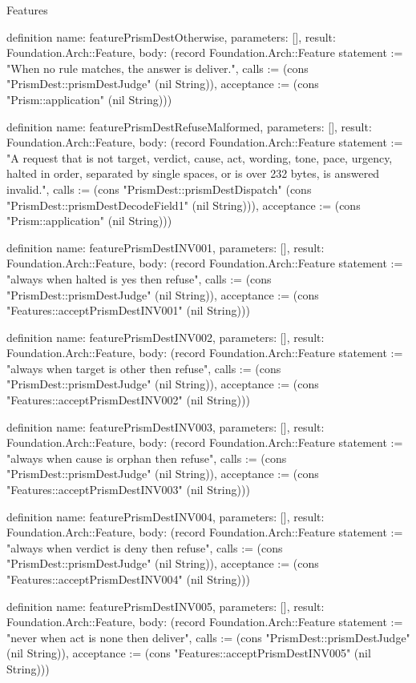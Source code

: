 \begin{lexlean}{Features}
\begin{semanticmodule}
definition{
  name: featurePrismDestOtherwise,
  parameters: [],
  result: Foundation.Arch::Feature,
  body: (record Foundation.Arch::Feature {statement := "When no rule matches, the answer is deliver.", calls := (cons "PrismDest::prismDestJudge" (nil String)), acceptance := (cons "Prism::application" (nil String))})
}

definition{
  name: featurePrismDestRefuseMalformed,
  parameters: [],
  result: Foundation.Arch::Feature,
  body: (record Foundation.Arch::Feature {statement := "A request that is not target, verdict, cause, act, wording, tone, pace, urgency, halted in order, separated by single spaces, or is over 232 bytes, is answered invalid.", calls := (cons "PrismDest::prismDestDispatch" (cons "PrismDest::prismDestDecodeField1" (nil String))), acceptance := (cons "Prism::application" (nil String))})
}

definition{
  name: featurePrismDestINV001,
  parameters: [],
  result: Foundation.Arch::Feature,
  body: (record Foundation.Arch::Feature {statement := "always when halted is yes then refuse", calls := (cons "PrismDest::prismDestJudge" (nil String)), acceptance := (cons "Features::acceptPrismDestINV001" (nil String))})
}

definition{
  name: featurePrismDestINV002,
  parameters: [],
  result: Foundation.Arch::Feature,
  body: (record Foundation.Arch::Feature {statement := "always when target is other then refuse", calls := (cons "PrismDest::prismDestJudge" (nil String)), acceptance := (cons "Features::acceptPrismDestINV002" (nil String))})
}

definition{
  name: featurePrismDestINV003,
  parameters: [],
  result: Foundation.Arch::Feature,
  body: (record Foundation.Arch::Feature {statement := "always when cause is orphan then refuse", calls := (cons "PrismDest::prismDestJudge" (nil String)), acceptance := (cons "Features::acceptPrismDestINV003" (nil String))})
}

definition{
  name: featurePrismDestINV004,
  parameters: [],
  result: Foundation.Arch::Feature,
  body: (record Foundation.Arch::Feature {statement := "always when verdict is deny then refuse", calls := (cons "PrismDest::prismDestJudge" (nil String)), acceptance := (cons "Features::acceptPrismDestINV004" (nil String))})
}

definition{
  name: featurePrismDestINV005,
  parameters: [],
  result: Foundation.Arch::Feature,
  body: (record Foundation.Arch::Feature {statement := "never when act is none then deliver", calls := (cons "PrismDest::prismDestJudge" (nil String)), acceptance := (cons "Features::acceptPrismDestINV005" (nil String))})
}


\end{semanticmodule}
\end{lexlean}
